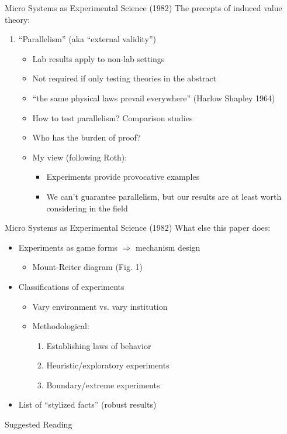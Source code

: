\begin{frame}{Micro Systems as Experimental Science (1982)}
    The precepts of induced value theory:
    \begin{enumerate}
        \conti
        \item ``Parallelism'' (aka ``external validity'')
        \begin{itemize}
            \item Lab results apply to non-lab settings
            \item Not required if only testing theories in the abstract
            \item ``the same physical laws prevail everywhere'' (Harlow Shapley 1964)
            \item How to test parallelism? Comparison studies
            \item Who has the burden of proof?
            \item My view (following Roth):
            \begin{itemize}
                \item Experiments provide provocative examples
                \item We can't guarantee parallelism, but our results are at least worth considering in the field
            \end{itemize}
        \end{itemize}
        \seti
    \end{enumerate}
\end{frame}

\begin{frame}{Micro Systems as Experimental Science (1982)}
    What else this paper does:
    \begin{itemize}
        \item Experiments as game forms $\Rightarrow$ mechanism design
        \begin{itemize}
            \item Mount-Reiter diagram (Fig. 1)
        \end{itemize}
        \item Classifications of experiments
        \begin{itemize}
            \item Vary environment vs. vary institution
            \item Methodological:
            \begin{enumerate}
                \item Establishing laws of behavior
                \item Heuristic/exploratory experiments
                \item Boundary/extreme experiments
            \end{enumerate}
        \end{itemize}
        \item List of ``stylized facts'' (robust results)
    \end{itemize}
\end{frame}

\nocite{Smith1976,Smith1982}

\begin{frame}[allowframebreaks]{Suggested Reading}
    
\end{frame}

